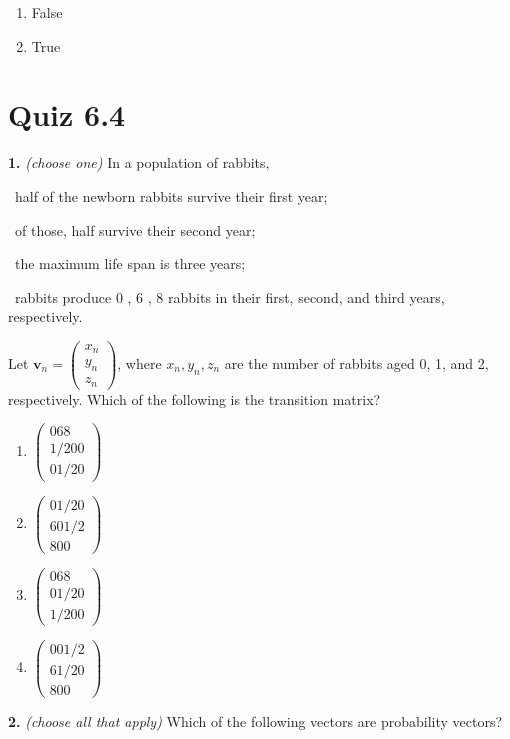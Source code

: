 \documentclass[10pt,a4paper]{article}
\begin{document}
\begin{enumerate}[label=(\Alph*)]
\item False
\item True
\end{enumerate}
\smallskip
\section{Quiz 6.4}
\textbf{1.} \textit{(choose one)} In a population of rabbits,

\quad\textbullet\ half of the newborn rabbits survive their first year;

\quad\textbullet\ of those, half survive their second year;

\quad\textbullet\ the maximum life span is three years;

\quad\textbullet\ rabbits produce  0 ,  6 ,  8  rabbits in their first, second, and third years, respectively.

Let \(\mathbf{v}_n=\begin{pmatrix}x_n\\y_n\\z_n\end{pmatrix}\), where \(x_n,y_n,z_n\) are the number of rabbits aged  0, 1, and  2, respectively. Which of the following is the transition matrix?

\begin{enumerate}[label=(\Alph*)]
\item \(\begin{pmatrix}068\\1/200\\01/20\end{pmatrix}\)
\item \(\begin{pmatrix}01/20\\601/2\\800\end{pmatrix}\)
\item \(\begin{pmatrix}068\\01/20\\1/200\end{pmatrix}\)
\item \(\begin{pmatrix}001/2\\61/20\\800\end{pmatrix}\)
\end{enumerate}
\smallskip
\textbf{2.} \textit{(choose all that apply)} Which of the following vectors are probability vectors?
\end{document}
